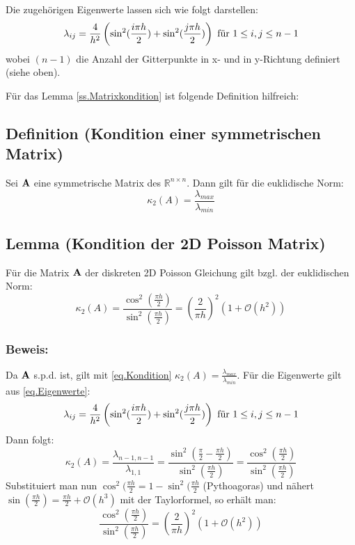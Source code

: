 Die zugehörigen Eigenwerte lassen sich wie folgt darstellen:
\begin{equation}
\lambda_{ij} = \frac {4} {h^{2}} \left(\sin^{2}(\frac {i \pi h} {2}) + \sin^{2}(\frac {j \pi h} {2}) \right) \textnormal{ für } 1 \le i,j \le n-1\label{eq.Eigenwerte}
\end{equation}
wobei $(n-1)$ die Anzahl der Gitterpunkte in x- und in y-Richtung definiert (siehe oben).

Für das Lemma \autoref{ss.Matrixkondition} ist folgende Definition hilfreich:

\subsection{Definition (Kondition einer symmetrischen Matrix)}\label{ss.Definition Kondition einer Matrix}

Sei ${\textbf{A}}$ eine symmetrische Matrix des $\mathbb{R}^{n \times n}$. Dann gilt für die euklidische Norm:
\begin{equation}
\kappa_{2} (A) = \frac {\lambda_{max}} {\lambda_{min}}\label{eq.Kondition}
\end{equation}

\subsection{Lemma (Kondition der 2D Poisson Matrix)}\label{ss.Matrixkondition}

Für die Matrix ${\textbf{A}}$ der diskreten 2D Poisson Gleichung gilt bzgl. der euklidischen Norm:
\begin{equation}
\kappa_{2} (A) = \frac {\cos^{2}(\frac{\pi h}{2})} {\sin^{2}(\frac{\pi h}{2})} = \left( \frac {2} {\pi h} \right)^{2} (1 + \mathcal{O}(h^{2}))
\end{equation}

\subsubsection{Beweis:}

Da ${\textbf{A}}$ s.p.d. ist, gilt mit \autoref{eq.Kondition} $\kappa_{2} (A) = \frac {\lambda_{max}} {\lambda_{min}}$. Für die Eigenwerte gilt aus \autoref{eq.Eigenwerte}:
\begin{equation}
\lambda_{ij} = \frac {4} {h^{2}} \left(\sin^{2}(\frac {i \pi h} {2}) + \sin^{2}(\frac {j \pi h} {2}) \right) \textnormal{ für } 1 \le i,j \le n-1
\end{equation}
Dann folgt:
\begin{equation}
\kappa_{2} (A) = \frac {\lambda_{n-1,n-1}} {\lambda_{1,1}} = \frac {\sin^{2} (\frac {\pi} {2} - \frac {\pi h} {2})} {\sin^{2} (\frac {\pi h} {2})} = \frac {\cos^{2} (\frac {\pi h} {2})} {\sin^{2} (\frac {\pi h} {2})}
\end{equation}
Substituiert man nun $\cos^{2}(\frac {\pi h} {2} = 1 - \sin^{2}(\frac {\pi h} {2}$ (Pythoagoras) und nähert $\sin (\frac {\pi h} {2}) = \frac {\pi h} {2} + \mathcal{O}(h^{3})$ mit der Taylorformel, so erhält man:
\begin{equation}
\frac {\cos^{2} (\frac {\pi h} {2})} {\sin^{2} (\frac {\pi h} {2})} = \left( \frac {2} {\pi h} \right)^{2} (1 + \mathcal{O}(h^{2}))
\end{equation}

